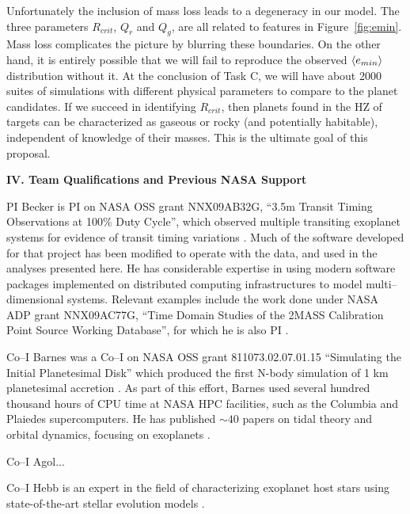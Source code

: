 Unfortunately the inclusion of mass loss leads to a degeneracy in our
model.  The three parameters $R_{crit}$, $Q_r$ and $Q_g$, are all
related to features in Figure~\ref{fig:emin}.  Mass loss complicates
the picture by blurring these boundaries.  On the other hand, it is
entirely possible that we will fail to reproduce the observed
$\left< e_{min} \right>$ distribution without it.  At the conclusion of Task C,
we will have about 2000 suites of simulations with different physical
parameters to compare to the
\kepler planet candidates.  If we succeed in identifying $R_{crit}$,
then planets found in the HZ of \kepler targets can be characterized
as gaseous or rocky (and potentially habitable), independent of
knowledge of their masses.  This is the ultimate goal of this
proposal.

\bigskip
\centerline{\bf IV. Team Qualifications and Previous NASA Support}
\smallskip

PI Becker is PI on NASA OSS grant NNX09AB32G, ``3.5m Transit Timing
Observations at 100\% Duty Cycle'', which observed multiple transiting
exoplanet systems for evidence of transit timing variations
\citep{2011ApJ...731..123K, 2013ApJ...764....8K, 2013ApJ...764L..17B,
  2013arXiv1304.5713K}.  Much of the software developed for that
project has been modified to operate with the \kepler data, and used in
the analyses presented here.  He has considerable expertise in using
modern software packages implemented on distributed computing
infrastructures to model multi--dimensional systems.  Relevant
examples include the work done under NASA ADP grant NNX09AC77G, ``Time
Domain Studies of the 2MASS Calibration Point Source Working
Database'', for which he is also PI
\citep{2012ApJ...748...58D,2013ApJ...764...62D}.

Co--I Barnes was a Co--I on NASA OSS grant 811073.02.07.01.15
``Simulating the Initial Planetesimal Disk'' which produced the first
N-body simulation of 1 km planetesimal accretion
\citep{Barnes09_1km}. As part of this effort, Barnes used several hundred thousand hours of CPU time at NASA HPC facilities, such as the Columbia and Plaiedes supercomputers. He has published $\sim 40$ papers on tidal theory and orbital dynamics, focusing on exoplanets
\citep[e.g.][]{BarnesQuinn01,BarnesRaymond04,BarnesGreenberg06a,Barnes11,Barnes13}. 

Co--I Agol...

Co--I Hebb is an expert in the field of characterizing exoplanet host
stars using state-of-the-art stellar evolution
models \citep[e.g.][]{Hebb2009,Hebb2010,Bouchy2010,Yilen2013}.

